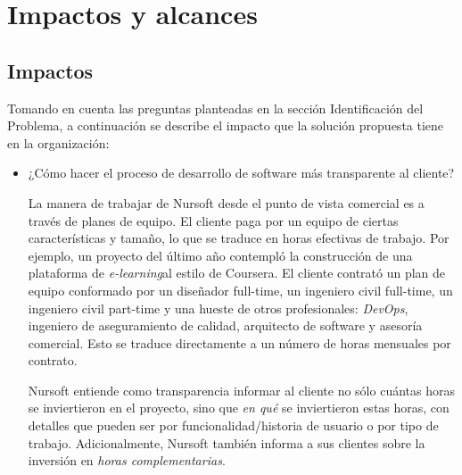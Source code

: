 \section{Impactos y alcances}

\subsection{Impactos}

Tomando en cuenta las preguntas planteadas en la sección Identificación del Problema,
a continuación se describe el impacto que la solución propuesta tiene en la organización:

\begin{itemize}
  \item ¿Cómo hacer el proceso de desarrollo de software más transparente al cliente?
  
  La manera de trabajar de Nursoft desde el punto de vista comercial es a través
  de planes de equipo.
  El cliente paga por un equipo de ciertas características y tamaño, lo que se
  traduce en horas efectivas de trabajo. Por ejemplo, un proyecto del último año
  contempló la construcción de una plataforma de \textit{e-learning}\footnotemark[1]
  al estilo de Coursera\cite{coursera}. El cliente contrató un plan de equipo conformado
  por un diseñador full-time, un ingeniero civil full-time, un ingeniero civil
  part-time y una hueste de otros profesionales: \textit{DevOps}\footnotemark[2], ingeniero de
  aseguramiento de calidad, arquitecto de software y asesoría comercial. Esto se
  traduce directamente a un número de horas mensuales por contrato.
  
  
  Nursoft entiende como transparencia informar al cliente no sólo cuántas horas
  se inviertieron en el proyecto, sino que \textit{en qué} se inviertieron estas horas,
  con detalles que pueden ser por funcionalidad/historia de usuario o por tipo de trabajo.
  Adicionalmente, Nursoft también informa a sus clientes sobre la inversión en
  \textit{horas complementarias}\footnotemark[3].



\end{itemize}
